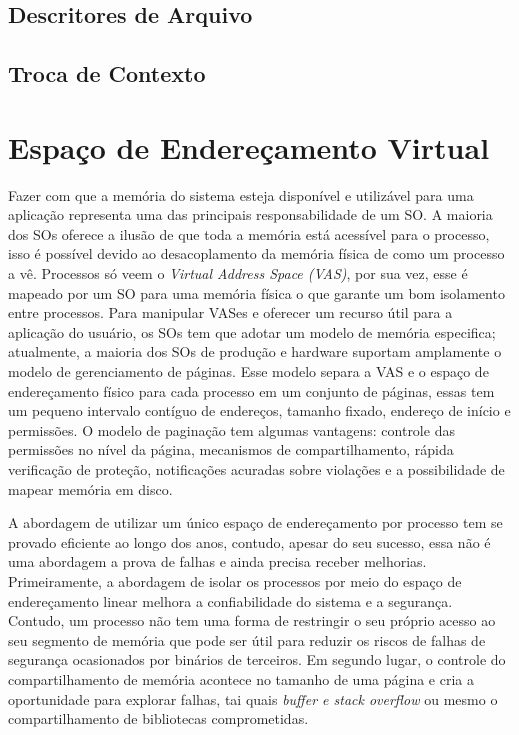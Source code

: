 \subsection{Descritores de Arquivo}

\subsection{Troca de Contexto}

\section{Espaço de Endereçamento Virtual}

Fazer com que a memória do sistema esteja disponível e utilizável para uma
aplicação representa uma das principais responsabilidade de um SO. A maioria
dos SOs oferece a ilusão de que toda a memória está acessível para o processo,
isso é possível devido ao desacoplamento da memória física de como um processo
a vê. Processos só veem o \emph{Virtual Address Space (VAS)}, por sua vez, esse
é mapeado por um SO para uma memória física o que garante um bom isolamento
entre processos. Para manipular VASes e oferecer um recurso útil para a
aplicação do usuário, os SOs tem que adotar um modelo de memória especifica;
atualmente, a maioria dos SOs de produção e hardware suportam amplamente o
modelo de gerenciamento de páginas.  Esse modelo separa a VAS e o espaço de
endereçamento físico para cada processo em um conjunto de páginas, essas tem um
pequeno intervalo contíguo de endereços, tamanho fixado, endereço de início e
permissões. O modelo de paginação tem algumas vantagens: controle das
permissões no nível da página, mecanismos de compartilhamento, rápida
verificação de proteção, notificações acuradas sobre violações e a
possibilidade de mapear memória em disco.

A abordagem de utilizar um único espaço de endereçamento por processo tem se
provado eficiente ao longo dos anos, contudo, apesar do seu sucesso, essa não é
uma abordagem a prova de falhas e ainda precisa receber melhorias. Primeiramente, a
abordagem de isolar os processos por meio do espaço de endereçamento linear
melhora a confiabilidade do sistema e a segurança. Contudo, um processo não tem
uma forma de restringir o seu próprio acesso ao seu segmento de memória que
pode ser útil para reduzir os riscos de falhas de segurança ocasionados por
binários de terceiros. Em segundo lugar, o controle do compartilhamento de
memória acontece no tamanho de uma página e cria a oportunidade para explorar
falhas, tai quais \emph{buffer e stack overflow} ou mesmo o compartilhamento de
bibliotecas comprometidas.

